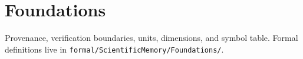 \section{Foundations}

Provenance, verification boundaries, units, dimensions, and symbol table.
Formal definitions live in \texttt{formal/ScientificMemory/Foundations/}.
